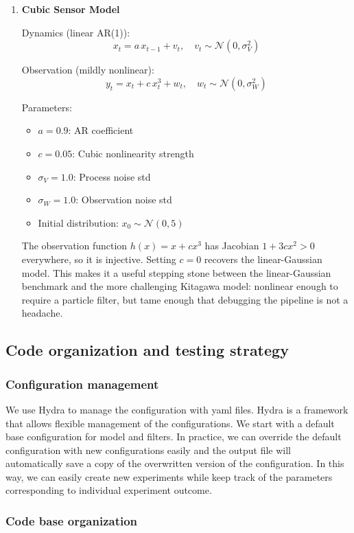 \documentclass{article}
\begin{document}
\begin{enumerate}
\item \textbf{Cubic Sensor Model}

Dynamics (linear AR(1)):
\[ x_t = a \, x_{t-1} + v_t, \quad v_t \sim \mathcal{N}(0, \sigma_V^2) \]

Observation (mildly nonlinear):
\[ y_t = x_t + c \, x_t^3 + w_t, \quad w_t \sim \mathcal{N}(0, \sigma_W^2) \]

Parameters:
\begin{itemize}
\item $a = 0.9$: AR coefficient
\item $c = 0.05$: Cubic nonlinearity strength
\item $\sigma_V = 1.0$: Process noise std
\item $\sigma_W = 1.0$: Observation noise std
\item Initial distribution: $x_0 \sim \mathcal{N}(0, 5)$
\end{itemize}
The observation function $h(x) = x + cx^3$ has Jacobian $1 + 3cx^2 > 0$ everywhere, so it is injective. Setting $c = 0$ recovers the linear-Gaussian model. This makes it a useful stepping stone between the linear-Gaussian benchmark and the more challenging Kitagawa model: nonlinear enough to require a particle filter, but tame enough that debugging the pipeline is not a headache.

\end{enumerate}
\subsection{Code organization and testing strategy}
\subsubsection{Configuration management}
We use Hydra to manage the configuration with yaml files. Hydra is a framework that allows flexible management of the configurations. We start with a default base configuration for model and filters. In practice, we can override the default configuration with new configurations easily and the output file will automatically save a copy of the overwritten version of the configuration. In this way, we can easily create new experiments while keep track of the parameters corresponding to individual experiment outcome.
\subsubsection{Code base organization}
\end{document}
